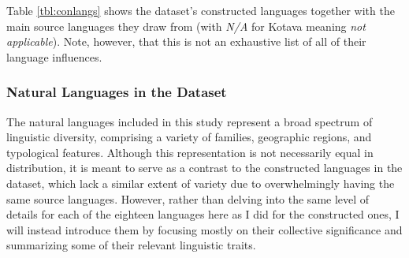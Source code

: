 \documentclass[12pt,a4paper]{article}
\numberwithin{figure}{section}
\numberwithin{table}{section}
\numberwithin{definition}{section}
\begin{document}
Table \ref{tbl:conlangs} shows the dataset's constructed languages together with the main source languages they draw from (with \textit{N/A} for Kotava meaning \textit{not applicable}). Note, however, that this is not an exhaustive list of all of their language influences.




\subsubsection{Natural Languages in the Dataset}
\label{ssec:naturallanguagesinthedataset}

The natural languages included in this study represent a broad spectrum of linguistic diversity, comprising a variety of families, geographic regions, and typological features. Although this representation is not necessarily equal in distribution, it is meant to serve as a contrast to the constructed languages in the dataset, which lack a similar extent of variety due to overwhelmingly having the same source languages. However, rather than delving into the same level of details for each of the eighteen languages here as I did for the constructed ones, I will instead introduce them by focusing mostly on their collective significance and summarizing some of their relevant linguistic traits.

\end{document}
